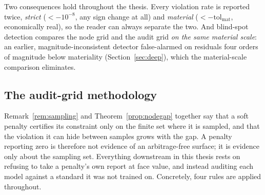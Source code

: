 Two consequences hold throughout the thesis. Every violation rate is reported twice, \emph{strict}
($<-10^{-8}$, any sign change at all) and \emph{material} ($<-\mathrm{tol}_{\mathrm{mat}}$,
economically real), so the reader can always separate the two. And blind-spot detection compares
the node grid and the audit grid \emph{on the same material scale}: an earlier,
magnitude-inconsistent detector false-alarmed on residuals four orders of magnitude below
materiality (Section~\ref{sec:deep}), which the material-scale comparison eliminates.

\subsection{The audit-grid methodology}
Remark~\ref{rem:sampling} and Theorem~\ref{prop:nodegap} together say that a soft penalty
certifies its constraint only on the finite set where it is sampled, and that the violation it
can hide between samples grows with the gap. A penalty reporting zero is therefore not evidence
of an arbitrage-free surface; it is evidence only about the sampling set. Everything downstream
in this thesis rests on refusing to take a penalty's own report at face value, and instead
auditing each model against a standard it was not trained on. Concretely, four rules are applied
throughout.

